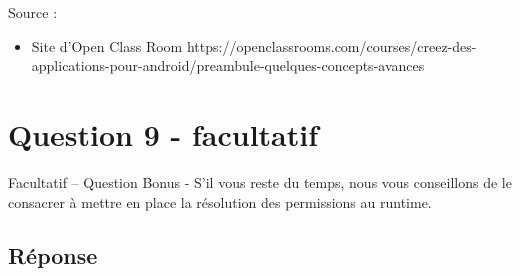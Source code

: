 \documentclass[francais,12pt]{article}
\begin{document}
		Source :
		\begin{itemize}
			\item Site d'Open Class Room\newline
			https://openclassrooms.com/courses/creez-des-applications-pour-android/preambule-quelques-concepts-avances
		\end{itemize} 
		
		
	\section*{Question 9 - facultatif}
		Facultatif – Question Bonus - S’il vous reste du temps, nous vous conseillons de le consacrer à mettre en place la résolution des permissions au runtime. 
		
		\subsection*{Réponse}
	
\end{document}
